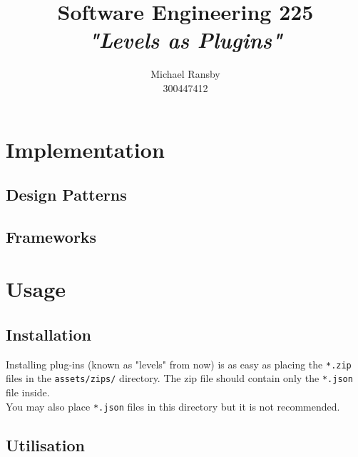 \documentclass[10pt,a4paper,titlepage]{article}
\author{Michael Ransby\\300447412}
\title{Software Engineering 225\\\textit{"Levels as Plugins"}}
\newcommand{\code}[1]{\colorbox{codegray}{\texttt{#1}}}
\begin{document}
\maketitle
\section{Implementation}
\subsection{Design Patterns}
\subsection{Frameworks}

\section{Usage}
\subsection{Installation}
Installing plug-ins (known as "levels" from now) is as easy as placing the \code{*.zip} files in the \code{assets/zips/} directory. The zip file should contain only the \code{*.json} file inside.\\
You may also place \code{*.json} files in this directory but it is not recommended.

\subsection{Utilisation}
\end{document}
